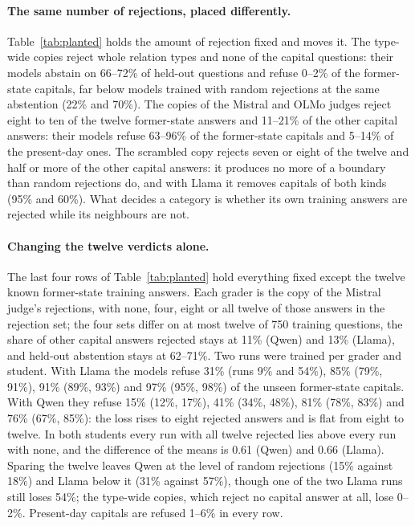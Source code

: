 \paragraph{The same number of rejections, placed differently.} Table~\ref{tab:planted} holds the amount of rejection fixed and moves it. The type-wide copies reject whole relation types and none of the capital questions: their models abstain on 66--72\% of held-out questions and refuse 0--2\% of the former-state capitals, far below models trained with random rejections at the same abstention (22\% and 70\%). The copies of the Mistral and OLMo judges reject eight to ten of the twelve former-state answers and 11--21\% of the other capital answers: their models refuse 63--96\% of the former-state capitals and 5--14\% of the present-day ones. The scrambled copy rejects seven or eight of the twelve and half or more of the other capital answers: it produces no more of a boundary than random rejections do, and with Llama it removes capitals of both kinds (95\% and 60\%). What decides a category is whether its own training answers are rejected while its neighbours are not.

\paragraph{Changing the twelve verdicts alone.} The last four rows of Table~\ref{tab:planted} hold everything fixed except the twelve known former-state training answers. Each grader is the copy of the Mistral judge's rejections, with none, four, eight or all twelve of those answers in the rejection set; the four sets differ on at most twelve of 750 training questions, the share of other capital answers rejected stays at 11\% (Qwen) and 13\% (Llama), and held-out abstention stays at 62--71\%. Two runs were trained per grader and student. With Llama the models refuse 31\% (runs 9\% and 54\%), 85\% (79\%, 91\%), 91\% (89\%, 93\%) and 97\% (95\%, 98\%) of the unseen former-state capitals. With Qwen they refuse 15\% (12\%, 17\%), 41\% (34\%, 48\%), 81\% (78\%, 83\%) and 76\% (67\%, 85\%): the loss rises to eight rejected answers and is flat from eight to twelve. In both students every run with all twelve rejected lies above every run with none, and the difference of the means is 0.61 (Qwen) and 0.66 (Llama). Sparing the twelve leaves Qwen at the level of random rejections (15\% against 18\%) and Llama below it (31\% against 57\%), though one of the two Llama runs still loses 54\%; the type-wide copies, which reject no capital answer at all, lose 0--2\%. Present-day capitals are refused 1--6\% in every row.


